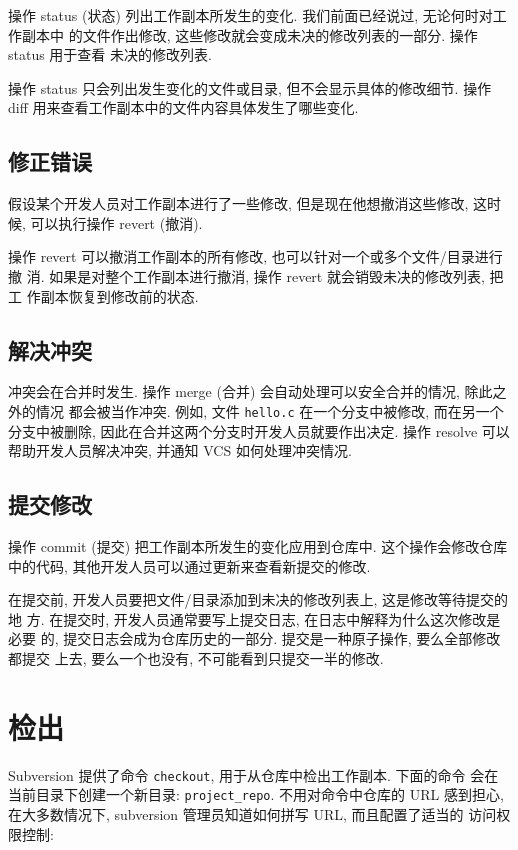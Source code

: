 \documentclass[nofonts, oneside]{ctexbook}
\newcommand\svn{\texttt{svn}}
\newcommand\svnco{\texttt{checkout}}
\begin{document}
操作 status (状态) 列出工作副本所发生的变化. 我们前面已经说过, 无论何时对工作副本中
的文件作出修改, 这些修改就会变成未决的修改列表的一部分. 操作 status 用于查看
未决的修改列表.

操作 status 只会列出发生变化的文件或目录, 但不会显示具体的修改细节. 操作
diff 用来查看工作副本中的文件内容具体发生了哪些变化.

\section{修正错误}
\label{sec:fix_mistakes}

假设某个开发人员对工作副本进行了一些修改, 但是现在他想撤消这些修改, 这时候,
可以执行操作 revert (撤消).

操作 revert 可以撤消工作副本的所有修改, 也可以针对一个或多个文件/目录进行撤
消. 如果是对整个工作副本进行撤消, 操作 revert 就会销毁未决的修改列表, 把工
作副本恢复到修改前的状态.

\section{解决冲突}

冲突会在合并时发生. 操作 merge (合并) 会自动处理可以安全合并的情况, 除此之外的情况
都会被当作冲突. 例如, 文件 \texttt{hello.c} 在一个分支中被修改, 而在另一个
分支中被删除, 因此在合并这两个分支时开发人员就要作出决定. 操作 resolve 可以
帮助开发人员解决冲突, 并通知 VCS 如何处理冲突情况.

\section{提交修改}
\label{sec:commit_changes}

操作 commit (提交) 把工作副本所发生的变化应用到仓库中. 这个操作会修改仓库中的代码,
其他开发人员可以通过更新来查看新提交的修改.

在提交前, 开发人员要把文件/目录添加到未决的修改列表上, 这是修改等待提交的地
方. 在提交时, 开发人员通常要写上提交日志, 在日志中解释为什么这次修改是必要
的, 提交日志会成为仓库历史的一部分. 提交是一种原子操作, 要么全部修改都提交
上去, 要么一个也没有, 不可能看到只提交一半的修改.

\chapter{检出}
\label{chap:checkout_process}

Subversion 提供了命令 \texttt{checkout}, 用于从仓库中检出工作副本. 下面的命令
会在当前目录下创建一个新目录: \texttt{project\_repo}. 不用对命令中仓库的 URL
感到担心, 在大多数情况下, subversion 管理员知道如何拼写 URL, 而且配置了适当的
访问权限控制:
\end{document}
